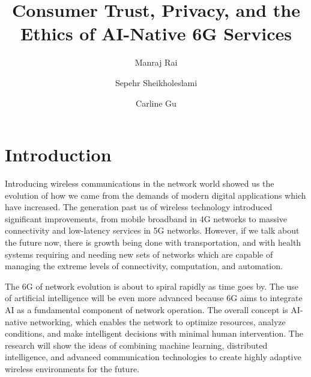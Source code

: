 
\title{Consumer Trust, Privacy, and the Ethics of AI-Native 6G Services}
\author{Manraj Rai \and Sepehr Sheikholeslami \and Carline Gu}



\maketitle

\begin{abstract}
\end{abstract}


\section{Introduction}

Introducing wireless communications in the network world showed us the evolution of
how we came from the demands of modern digital applications which have increased. The
generation past us of wireless technology introduced significant improvements, from mobile
broadband in 4G networks to massive connectivity and low-latency services in 5G networks.
However, if we talk about the future now, there is growth being done with transportation, and
with health systems requiring and needing new sets of networks which are capable of managing
the extreme levels of connectivity, computation, and automation.

The 6G of network evolution is about to spiral rapidly as time goes by. The use of
artificial intelligence will be even more advanced because 6G aims to integrate AI
as a fundamental component of network operation. The overall concept is AI-native
networking, which enables the network to optimize resources, analyze conditions, and make
intelligent decisions with minimal human intervention. The research will show the
ideas of combining machine learning, distributed intelligence, and advanced communication
technologies to create highly adaptive wireless environments for the future.

